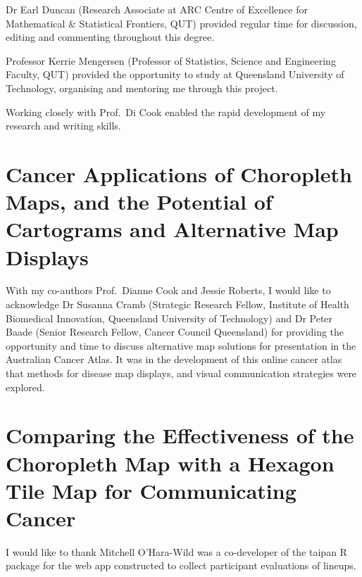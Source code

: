 \documentclass{monashthesis}
\begin{document}
Dr Earl Duncan (Research Associate at ARC Centre of Excellence for Mathematical \& Statistical Frontiers, QUT) provided regular time for discussion, editing and commenting throughout this degree.

Professor Kerrie Mengersen (Professor of Statistics, Science and Engineering Faculty, QUT) provided the opportunity to study at Queensland University of Technology, organising and mentoring me through this project.

Working closely with Prof.~Di Cook enabled the rapid development of my research and writing skills.

\hypertarget{cancer-applications-of-choropleth-maps-and-the-potential-of-cartograms-and-alternative-map-displays}{%
\section*{Cancer Applications of Choropleth Maps, and the Potential of Cartograms and Alternative Map Displays}\label{cancer-applications-of-choropleth-maps-and-the-potential-of-cartograms-and-alternative-map-displays}}

With my co-authors Prof.~Dianne Cook and Jessie Roberts, I would like to acknowledge Dr Susanna Cramb (Strategic Research Fellow, Institute of Health Biomedical Innovation, Queensland University of Technology) and Dr Peter Baade (Senior Research Fellow, Cancer Council Queensland) for providing the opportunity and time to discuss alternative map solutions for presentation in the Australian Cancer Atlas.
It was in the development of this online cancer atlas that methods for disease map displays, and visual communication strategies were explored.

\hypertarget{comparing-the-effectiveness-of-the-choropleth-map-with-a-hexagon-tile-map-for-communicating-cancer}{%
\section*{Comparing the Effectiveness of the Choropleth Map with a Hexagon Tile Map for Communicating Cancer}\label{comparing-the-effectiveness-of-the-choropleth-map-with-a-hexagon-tile-map-for-communicating-cancer}}

I would like to thank Mitchell O'Hara-Wild was a co-developer of the taipan \autocite{taipan} R package for the web app constructed to collect participant evaluations of lineups.
\end{document}
